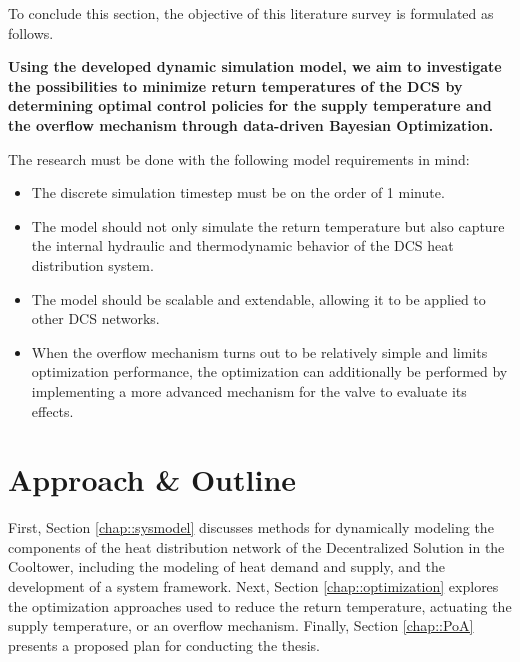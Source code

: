 \newpage 
To conclude this section, the objective of this literature survey is formulated as follows.

{\centering
\textbf{Using the developed dynamic simulation model, we aim to investigate the possibilities to minimize return temperatures of the DCS by determining optimal control policies for the supply temperature and the overflow mechanism through data-driven Bayesian Optimization.}\par
}

The research must be done with the following model requirements in mind:
\begin{itemize}
    \item The discrete simulation timestep must be on the order of 1 minute. 
    \item The model should not only simulate the return temperature but also capture the internal hydraulic and thermodynamic behavior of the DCS heat distribution system.
    \item The model should be scalable and extendable, allowing it to be applied to other DCS networks.
    \item When the overflow mechanism turns out to be relatively simple and limits optimization performance, the optimization can additionally be performed by implementing a more advanced mechanism for the valve to evaluate its effects.
\end{itemize}

\section{Approach \& Outline}
First, Section \ref{chap::sysmodel} discusses methods for dynamically modeling the components of the heat distribution network of the Decentralized Solution in the Cooltower, including the modeling of heat demand and supply, and the development of a system framework. Next, Section \ref{chap::optimization} explores the optimization approaches used to reduce the return temperature, actuating the supply temperature, or an overflow mechanism. Finally, Section \ref{chap::PoA} presents a proposed plan for conducting the thesis.



